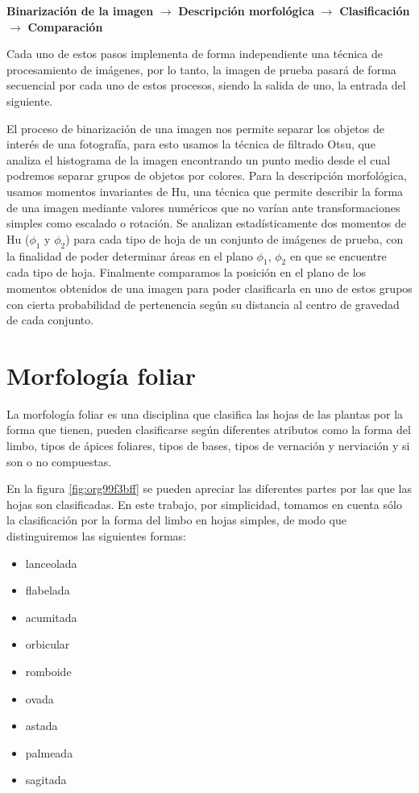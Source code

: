 \documentclass[letter]{article}
\begin{document}
\begin{center}
\textbf{Binarización de la imagen} \(\rightarrow\) \textbf{Descripción morfológica} \(\rightarrow\)
 \textbf{Clasificación} \(\rightarrow\) \textbf{Comparación}
\end{center}

Cada uno de estos pasos implementa de forma independiente una técnica de
procesamiento de imágenes, por lo tanto, la imagen de prueba pasará de forma
secuencial por cada uno de estos procesos, siendo la salida de uno, la entrada
del siguiente.

El proceso de binarización de una imagen nos permite separar los objetos de
interés de una fotografía, para esto usamos la técnica de filtrado Otsu, que
analiza el histograma de la imagen encontrando un punto medio desde el cual
podremos separar grupos de objetos por colores. Para la descripción morfológica,
usamos momentos invariantes de Hu, una técnica que permite describir la forma de
una imagen mediante valores numéricos que no varían ante transformaciones
simples como escalado o rotación. Se analizan estadísticamente dos momentos de
Hu (\(\phi_1\) y \(\phi_2\)) para cada tipo de hoja de un conjunto de imágenes de
prueba, con la finalidad de poder determinar áreas en el plano \(\phi_1\), \(\phi_2\)
en que se encuentre cada tipo de hoja. Finalmente comparamos la posición en el
plano de los momentos obtenidos de una imagen para poder clasificarla en uno de
estos grupos con cierta probabilidad de pertenencia según su distancia al
centro de gravedad de cada conjunto.

\section{Morfología foliar}
\label{sec:orgd0fe7ff}
La morfología foliar es una disciplina que clasifica las hojas de las plantas
por la forma que tienen, pueden clasificarse según diferentes atributos como la
forma del limbo, tipos de ápices foliares, tipos de bases, tipos de vernación y
nerviación y si son o no compuestas.

En la figura \ref{fig:org99f3bff} se pueden apreciar las diferentes partes por las que las
hojas son clasificadas. En este trabajo, por simplicidad, tomamos en cuenta sólo
la clasificación por la forma del limbo en hojas simples, de modo que
distinguiremos las siguientes formas:

\begin{itemize}
\item lanceolada
\item flabelada
\item acumitada
\item orbicular
\item romboide
\item ovada
\item astada
\item palmeada
\item sagitada
\end{itemize}
\end{document}
